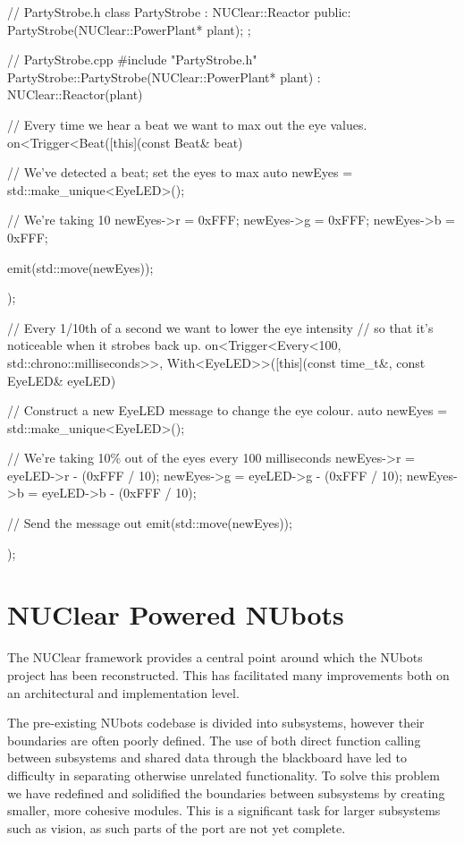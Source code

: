 \documentclass[english,12pt]{scrartcl}
\begin{document}
			\begin{cppcode}
				// PartyStrobe.h
				class PartyStrobe : NUClear::Reactor {
				    public:
				        PartyStrobe(NUClear::PowerPlant* plant);
				};
				
				// PartyStrobe.cpp
				#include "PartyStrobe.h"
				PartyStrobe::PartyStrobe(NUClear::PowerPlant* plant) 
				: NUClear::Reactor(plant) {
				    // Every time we hear a beat we want to max out the eye values.
				    on<Trigger<Beat([this](const Beat& beat) {
				        // We've detected a beat; set the eyes to max
				        auto newEyes = std::make_unique<EyeLED>();
				        
				        // We're taking 10%
				        newEyes->r = 0xFFF;
				        newEyes->g = 0xFFF;
				        newEyes->b = 0xFFF;
				        
				        emit(std::move(newEyes));
				    });
				
				    // Every 1/10th of a second we want to lower the eye intensity
				    // so that it's noticeable when it strobes back up.
				    on<Trigger<Every<100, std::chrono::milliseconds>>, 
				       With<EyeLED>>([this](const time_t&, const EyeLED& eyeLED) {
				        // Construct a new EyeLED message to change the eye colour.
				        auto newEyes = std::make_unique<EyeLED>();
				        
				        // We're taking 10\% out of the eyes every 100 milliseconds
				        newEyes->r = eyeLED->r - (0xFFF / 10);
				        newEyes->g = eyeLED->g - (0xFFF / 10);
				        newEyes->b = eyeLED->b - (0xFFF / 10);
				         
				         // Send the message out
				         emit(std::move(newEyes));
				    });
				}
			\end{cppcode}
			
	\section{NUClear Powered NUbots}
		The NUClear framework provides a central point around which the NUbots project has been
		reconstructed. This has facilitated many improvements both on an architectural and
		implementation level.
		
		The pre-existing NUbots codebase is divided into subsystems, however their boundaries are
		often poorly defined. The use of both direct function calling between subsystems and 
		shared data through the blackboard have led to difficulty in separating otherwise
		unrelated functionality. To solve this problem we have redefined and solidified the
		boundaries between subsystems by creating smaller, more cohesive modules. This is a
		significant task for larger subsystems such as vision, as such parts of the port are
		not yet complete.
		
\end{document}

